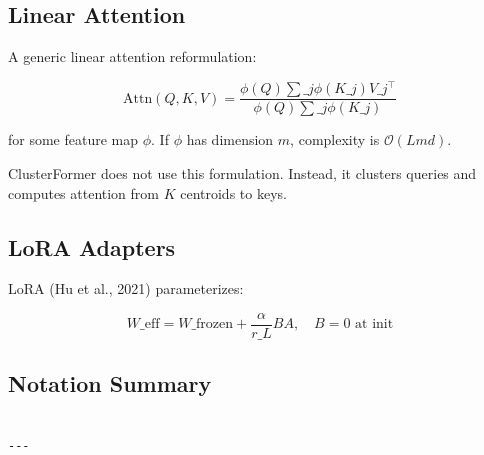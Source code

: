 \subsection{Linear Attention}

A generic linear attention reformulation:

\[
\text{Attn}(Q, K, V) = \frac{\phi(Q) \sum\_j \phi(K\_j) V\_j^\top}{\phi(Q) \sum\_j \phi(K\_j)}
\]

for some feature map $\phi$. If $\phi$ has dimension $m$, complexity is 
$\mathcal{O}(L m d)$.

ClusterFormer does not use this formulation. Instead, it clusters queries 
and computes attention from $K$ centroids to keys.

\subsection{LoRA Adapters}

LoRA (Hu et al., 2021) parameterizes:

\[
W\_\text{eff} = W\_\text{frozen} + \frac{\alpha}{r\_L} B A, \quad B = 0 \text{ at init}
\]

\subsection{Notation Summary}

\begin{lstlisting}

---
\end{lstlisting}